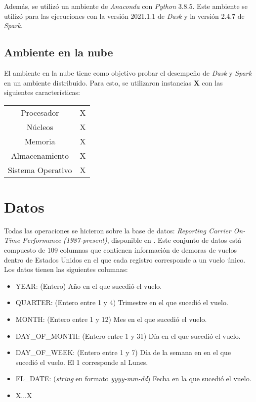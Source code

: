 Además, se utilizó un ambiente de \textit{Anaconda} con \textit{Python} 3.8.5. Este ambiente se utilizó para las ejecuciones con la versión 2021.1.1 de \textit{Dask} y la versión 2.4.7 de \textit{Spark}. 

\subsection{Ambiente en la nube}

El ambiente en la nube tiene como objetivo probar el desempeño de \textit{Dask} y \textit{Spark} en un ambiente distribuido. Para esto, se utilizaron instancias \textbf{X} con las siguientes características:

\begin{center}
\begin{tabular}{|c|c|}
 \hline
  Procesador & X \\ 
  Núcleos & X \\
  Memoria & X \\ 
  Almacenamiento & X \\ 
  Sistema Operativo & X \\
  \hline
\end{tabular}
\end{center}

\section{Datos}

Todas las operaciones se hicieron sobre la base de datos: 
\textit{Reporting Carrier On-Time Performance (1987-present)}, disponible en \cite{linktranstat}. Este conjunto de datos está compuesto de 109 columnas que contienen información de demoras de vuelos dentro de Estados Unidos en el que cada registro corresponde a un vuelo único. Los datos tienen las siguientes columnas:

\begin{itemize}
	\item YEAR: (Entero) Año en el que sucedió el vuelo.
	\item QUARTER: (Entero entre 1 y 4) Trimestre en el que sucedió el vuelo.
	\item MONTH: (Entero entre 1 y 12) Mes en el que sucedió el vuelo.
	\item DAY\_OF\_MONTH: (Entero entre 1 y 31) Día en el que sucedió el vuelo.
	\item DAY\_OF\_WEEK: (Entero entre 1 y 7) Día de la semana en en el que sucedió el vuelo. El 1 corresponde al Lunes.
	\item FL\_DATE: (\textit{string} en formato \textit{yyyy-mm-dd}) Fecha en la que sucedió el vuelo.
	\item \LARGE X...X
\end{itemize}

